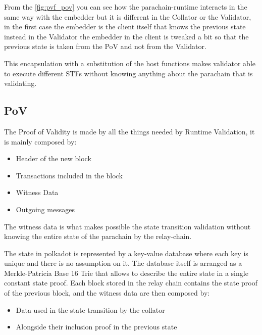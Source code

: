 
From the \ref{fig:pvf_pov} you can see how the parachain-runtime interacts in the same way with the embedder but it is different in the Collator or the Validator, in the first case the embedder is the client itself that knows the previous state instead in the Validator the embedder in the client is tweaked a bit so that the previous state is taken from the PoV and not from the Validator.

This encapsulation with a substitution of the host functions makes  validator able to execute different STFs without knowing anything about the parachain that is validating.

\subsection{PoV}

The Proof of Validity is made by all the things needed by Runtime Validation, it is mainly composed by:~\cite{cumulus-docs}

\begin{itemize}
  \item Header of the new block
  \item Transactions included in the block
  \item Witness Data
  \item Outgoing messages
\end{itemize}

The witness data is what makes possible the state transition validation without knowing the entire state of the parachain by the relay-chain.

The state in polkadot is represented by a key-value database where each key is unique and there is no assumption on it. The database itself is arranged as a Merkle-Patricia Base 16 Trie that allows to describe the entire state in a single constant state proof. Each block stored in the relay chain contains the state proof of the previous block, and the witness data are then composed by:



\begin{itemize}
  \item Data used in the state transition by the collator
  \item Alongside their inclusion proof in the previous state
\end{itemize}

